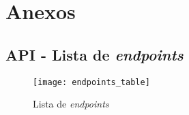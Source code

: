 
\section{Anexos}

\subsection{API - Lista de \textit{endpoints}}

\begin{figure}[h]
	\centering
	\texttt{[image: endpoints\_table]}
	\caption{Lista de \textit{endpoints}}
\end{figure}